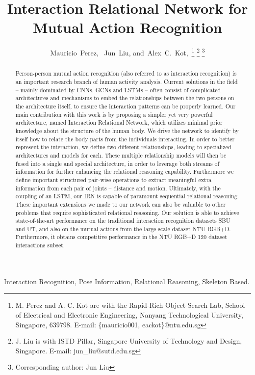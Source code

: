 \documentclass[journal,twoside]{IEEEtran}
\begin{document}
\title{Interaction Relational Network for\\ Mutual Action Recognition}

\author{Mauricio~Perez,~
        Jun~Liu,
        and~Alex~C.~Kot,~\thanks{M. Perez and A. C. Kot are with the Rapid-Rich Object Search Lab, School of Electrical and Electronic Engineering, Nanyang Technological University, Singapore, 639798. E-mail: \{mauricio001, eackot\}@ntu.edu.sg}
\thanks{J. Liu is with ISTD Pillar, Singapore University of Technology and Design, Singapore. E-mail: {jun\_liu}@sutd.edu.sg}
\thanks{Corresponding author: Jun Liu}
}






\maketitle

\begin{abstract}

Person-person mutual action recognition (also referred to as interaction recognition) is an important research branch of human activity analysis. 
Current solutions in the field -- mainly dominated by CNNs, GCNs and LSTMs -- often consist of complicated architectures and mechanisms to embed the relationships between the two persons on the architecture itself, to ensure the interaction patterns can be properly learned.
Our main contribution with this work is by proposing a simpler yet very powerful architecture, named Interaction Relational Network, which utilizes minimal prior knowledge about the structure of the human body. 
We drive the network to identify by itself how to relate the body parts from the individuals interacting.
In order to better represent the interaction, we define two different relationships, leading to specialized architectures and models for each. These multiple relationship models will then be fused into a single and special architecture, in order to leverage both streams of information for further enhancing the relational reasoning capability.
Furthermore we define important structured pair-wise operations to extract meaningful extra information from each pair of joints -- distance and motion. 
Ultimately, with the coupling of an LSTM, our IRN is capable of paramount sequential relational reasoning.
These important extensions we made to our network can also be valuable to other problems that require sophisticated relational reasoning.
Our solution is able to achieve state-of-the-art performance on the traditional interaction recognition datasets SBU and UT, and also on the mutual actions from the large-scale dataset NTU RGB+D. Furthermore, it obtains competitive performance in the NTU RGB+D 120 dataset interactions subset.

\end{abstract} 
\begin{IEEEkeywords}
Interaction Recognition, Pose Information, Relational Reasoning, Skeleton Based.
\end{IEEEkeywords}
\end{document}
